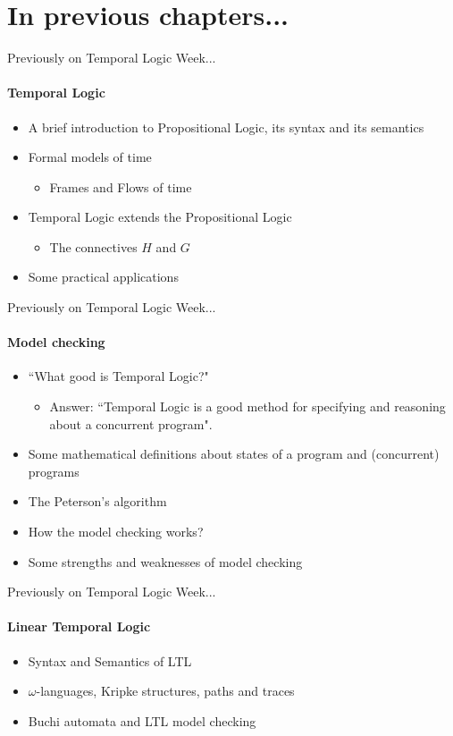 
\section{In previous chapters...}
\begin{frame}{Previously on Temporal Logic Week...}
  \framesubtitle{Temporal Logic}
  \begin{itemize}
	\item 
	{
		A brief introduction to Propositional Logic, its syntax and its semantics
		\pause
	}
	\item
	{
		Formal models of time
		\pause
		\begin{itemize}
			\item Frames and Flows of time
			\pause
		\end{itemize}
	}
	\item
	{
		Temporal Logic extends the Propositional Logic
		\begin{itemize}
			\item The connectives $H$ and $G$ \pause
		\end{itemize}
	}
	\item
	{
		Some practical applications
	}
  \end{itemize}

\end{frame}


\begin{frame}{Previously on Temporal Logic Week...}
  \framesubtitle{Model checking}
  \begin{itemize}
	  \item
	  {
		  ``What good is Temporal Logic?"
		  \pause
		  \begin{itemize}
			  \item
			  {
				  Answer: ``Temporal Logic is a good method for specifying and reasoning about a concurrent program".
				  \pause
			  }
		  \end{itemize}
	  }
	  \item
	  {
		  Some mathematical definitions about states of a program and (concurrent) programs
		  \pause
	  }
	  \item
	  {
		  The Peterson's algorithm
		  \pause
	  }
	  \item
	  {
		  How the model checking works?
		  \pause
	  }
	  \item
	  {
		  Some strengths and weaknesses of model checking
	  }
  \end{itemize}
\end{frame}

\begin{frame}{Previously on Temporal Logic Week...}
    \framesubtitle{Linear Temporal Logic}
    \begin{itemize}
        \item Syntax and Semantics of LTL \pause
        
        \item $\omega$-languages, Kripke structures, paths and traces
        
        \item Buchi automata and LTL model checking
    \end{itemize}
\end{frame}